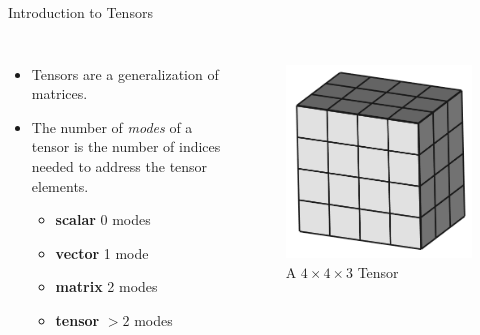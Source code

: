 \documentclass[handout]{beamer}
\begin{document}
\begin{frame}{Introduction to Tensors}
\begin{columns}
\begin{itemize}[<+->]
\item Tensors are a generalization of matrices.
\item The number of {\em modes} of a tensor is the number of indices needed to address the tensor elements.
  \begin{itemize}[<+->]
  \item {\bf scalar} 0 modes
  \item {\bf vector} 1 mode
  \item {\bf matrix} 2 modes
  \item {\bf tensor} $>2$ modes
  \end{itemize}
\end{itemize}
\begin{figure}
\centering
\includegraphics[width=\textwidth]{diagrams/tensor}
{\small A $4\times4\times3$ Tensor}
\end{figure}
\end{columns}
\end{frame}
\end{document}
